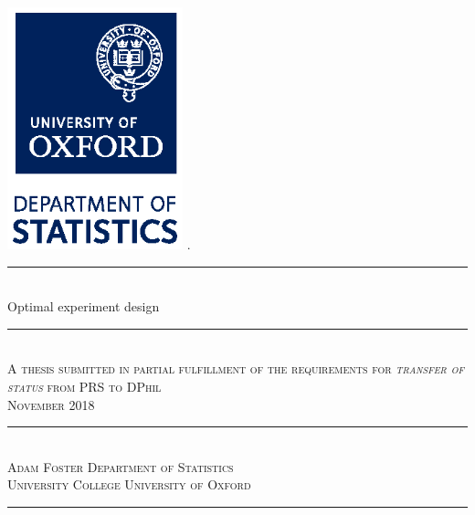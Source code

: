 \documentclass[TRANSFER_THESIS.tex]{subfiles}
\begin{document}
\thispagestyle{empty}
\begin{titlepage}
\begin{center}
\hfill \includegraphics[width=2.0in]{figures/Dept_Stats_logo_vertical_CMYK.eps} \hfill . \\
\vspace{3cm}
\rule{150mm}{0.5mm} \\ [16pt]
\Huge Optimal experiment design
\rule{150mm}{0.5mm} \\ [4pt]
\vfill
\large \textsc{A thesis submitted in partial fulfillment of the requirements for \textit{transfer of status} from PRS to DPhil} \\
\vspace{1cm}
\large \textsc{November 2018} \\
\rule{\textwidth}{0.5mm} \\ [4pt]
{\fontsize{14}{14}\textsc{Adam Foster} \hfill \textsc{Department of Statistics}} \\ [8pt]
{\fontsize{14}{14} \textsc{University College \hfill University of Oxford}}
\rule{\textwidth}{0.5mm} \\ [4pt]
\end{center}
\vspace{2cm}
\end{titlepage}
\end{document}

